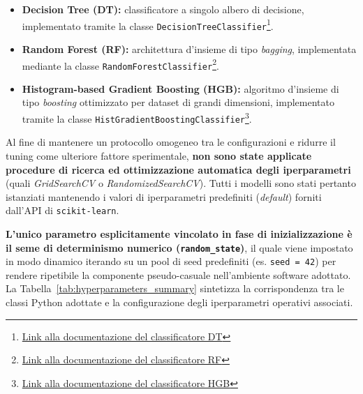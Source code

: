 \begin{itemize}
    \item \textbf{Decision Tree (DT):} classificatore a singolo albero di decisione, implementato tramite la classe \texttt{DecisionTreeClassifier}\footnote{\href{https://scikit-learn.org/stable/modules/generated/sklearn.tree.DecisionTreeClassifier}{Link alla documentazione del classificatore DT}}.
    \item \textbf{Random Forest (RF):} architettura d'insieme di tipo \textit{bagging}, implementata mediante la classe \texttt{RandomForestClassifier}\footnote{\href{https://scikit-learn.org/stable/modules/generated/sklearn.ensemble.RandomForestClassifier}{Link alla documentazione del classificatore RF}}.
    \item \textbf{Histogram-based Gradient Boosting (HGB):} algoritmo d'insieme di tipo \textit{boosting} ottimizzato per dataset di grandi dimensioni, implementato tramite la classe \newline \texttt{HistGradientBoostingClassifier}\footnote{\href{https://scikit-learn.org/stable/modules/generated/sklearn.ensemble.HistGradientBoostingClassifier}{Link alla documentazione del classificatore HGB}}.
\end{itemize}

Al fine di mantenere un protocollo omogeneo tra le configurazioni e ridurre il tuning come ulteriore fattore sperimentale, \textbf{non sono state applicate procedure di ricerca ed ottimizzazione automatica degli iperparametri} (quali \textit{GridSearchCV} o \textit{RandomizedSearchCV}). 
Tutti i modelli sono stati pertanto istanziati mantenendo i valori di iperparametri predefiniti (\textit{default}) forniti dall'API di \texttt{scikit-learn}. 

\textbf{L'unico parametro esplicitamente vincolato in fase di inizializzazione è il seme di determinismo numerico (\texttt{random\_state})}, il quale viene impostato in modo dinamico iterando su un pool di seed predefiniti (es. \texttt{seed = 42}) per rendere ripetibile la componente pseudo-casuale nell'ambiente software adottato. 
La Tabella~\ref{tab:hyperparameters_summary} sintetizza la corrispondenza tra le classi Python adottate e la configurazione degli iperparametri operativi associati.

